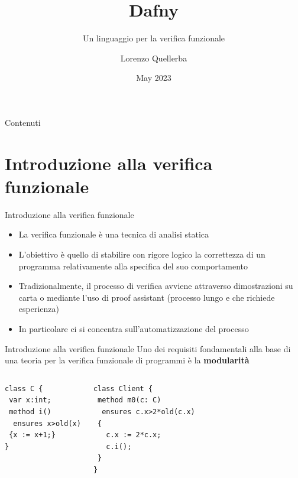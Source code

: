 \documentclass[]{beamer}
\title{Dafny}
\subtitle{Un linguaggio per la verifica funzionale}
\author{Lorenzo Quellerba}
\institute{Università degli Studi di Torino}
\date{May 2023}
\begin{document}
\maketitle
\begin{frame}{Contenuti}
    \tableofcontents
\end{frame}
\section{Introduzione alla verifica funzionale}
\begin{frame}{Introduzione alla verifica funzionale}
    \begin{itemize}
        \item La verifica funzionale è una tecnica di analisi statica
        \item L'obiettivo è quello di stabilire con rigore logico la correttezza di un programma relativamente alla specifica del suo comportamento
        \item Tradizionalmente, il processo di verifica avviene attraverso dimostrazioni su carta o mediante l'uso di proof assistant (processo lungo e che richiede esperienza)
        \item In particolare ci si concentra sull'automatizzazione del processo
    \end{itemize}
\end{frame}

\begin{frame}[containsverbatim]{Introduzione alla verifica funzionale}\vspace{10pt}
Uno dei requisiti fondamentali alla base di una teoria per la verifica funzionale di programmi è la \textbf{modularità}
\begin{columns}[onlytextwidth]
    \column{0.5\pagewidth}
    \begin{center}
         \begin{lstlisting}
class C {
 var x:int;
 method i()
  ensures x>old(x)
 {x := x+1;}
}
        \end{lstlisting}
\end{center}
    \column{0.5\pagewidth}
    \begin{center}
        \begin{lstlisting}
class Client {
 method m0(c: C)
  ensures c.x>2*old(c.x)
 {
   c.x := 2*c.x;
   c.i();
 }
}
\end{lstlisting}
\end{center}
\end{columns}
\end{frame}
\end{document}
